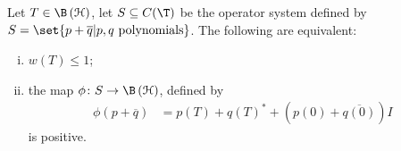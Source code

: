 \documentclass[10pt]{mypackage}
\begin{document}
\begin{theorem}
  Let $T\in \B\left( \mathcal{H} \right)$, let $S\subseteq C(\T)$ be the operator system defined by $S = \set{p + \overline{q} | p,q\text{ polynomials}}$. The following are equivalent:
  \begin{enumerate}[(i)]
    \item $w(T)\leq 1$;
    \item the map $\phi\colon S\rightarrow \B\left( \mathcal{H} \right)$, defined by
      \begin{align*}
        \phi\left( p + \overline{q} \right) &= p(T) + q\left( T \right)^{\ast} + \left( p(0) + \overline{q(0)} \right) I
      \end{align*}
      is positive.
  \end{enumerate}
\end{theorem}
\end{document}
